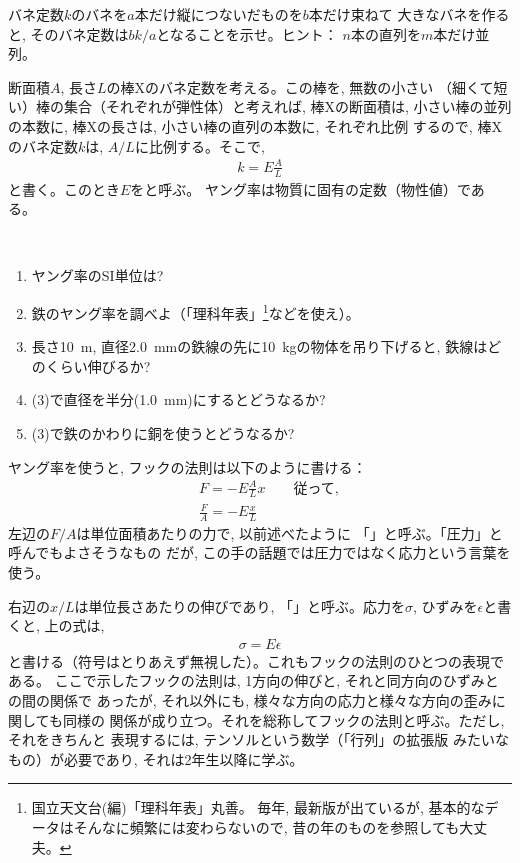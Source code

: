 %
\begin{q}\label{q:spring_big}
バネ定数$k$のバネを$a$本だけ縦につないだものを$b$本だけ束ねて
大きなバネを作ると, そのバネ定数は$bk/a$となることを示せ。ヒント：
$n$本の直列を$m$本だけ並列。
\end{q}
\mv


断面積$A$, 長さ$L$の棒Xのバネ定数を考える。この棒を, 無数の小さい
（細くて短い）棒の集合（それぞれが弾性体）と考えれば, 棒Xの断面積は, 
小さい棒の並列の本数に, 棒Xの長さは, 小さい棒の直列の本数に, それぞれ比例
するので, 棒Xのバネ定数$k$は, $A/L$に比例する。そこで, 
\begin{eqnarray}
k=E\frac{A}{L}
\end{eqnarray}
と書く。このとき$E$をと呼ぶ。
ヤング率は物質に固有の定数（物性値）である。

\begin{q}\label{q:YoungModulus}　
\begin{enumerate}
\item ヤング率のSI単位は?
\item 鉄のヤング率を調べよ（「理科年表」\footnote{国立天文台(編)「理科年表」丸善。
毎年, 最新版が出ているが, 基本的なデータはそんなに頻繁には変わらないので, 昔の年のものを参照しても大丈夫。}などを使え）。
\item 長さ10~m, 直径2.0~mmの鉄線の先に10~kgの物体を吊り下げると, 鉄線はどのくらい伸びるか?
\item (3)で直径を半分(1.0~mm)にするとどうなるか?
\item (3)で鉄のかわりに銅を使うとどうなるか?
\end{enumerate}
\end{q}
\mv

ヤング率を使うと, フックの法則は以下のように書ける：
\begin{eqnarray}
&&F=-E\frac{A}{L}x\text{　　従って, }\nonumber\\
&&\frac{F}{A}=-E\frac{x}{L}
\end{eqnarray}
左辺の$F/A$は単位面積あたりの力で, 以前述べたように
「」と呼ぶ。「圧力」と呼んでもよさそうなもの
だが, この手の話題では圧力ではなく応力という言葉を使う。

右辺の$x/L$は単位長さあたりの伸びであり, 
「」と呼ぶ。応力を$\sigma$, 
ひずみを$\epsilon$と書くと, 上の式は, 
\begin{eqnarray}
\sigma=E\epsilon
\end{eqnarray}
と書ける（符号はとりあえず無視した）。これもフックの法則のひとつの表現である。
ここで示したフックの法則は, 1方向の伸びと, それと同方向のひずみとの間の関係で
あったが, それ以外にも, 様々な方向の応力と様々な方向の歪みに関しても同様の
関係が成り立つ。それを総称してフックの法則と呼ぶ。ただし, それをきちんと
表現するには, テンソルという数学（「行列」の拡張版
みたいなもの）が必要であり, それは2年生以降に学ぶ。\mv

